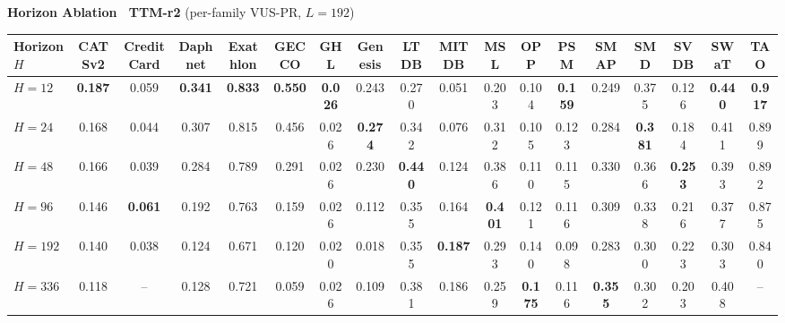 \documentclass[border=2pt,varwidth=\maxdimen]{standalone}
\begin{document}
\begin{center}
\textbf{\large Horizon Ablation \textemdash\ TTM-r2} \quad (per-family VUS-PR, $L=192$)\par\vspace{6pt}
\renewcommand{\arraystretch}{1.1}
\setlength{\tabcolsep}{3pt}
\footnotesize

\begin{tabular}{l|ccccccccccccccccc}
\toprule
\textbf{Horizon $H$} & \textbf{CATSv2} & \textbf{CreditCard} & \textbf{Daphnet} & \textbf{Exathlon} & \textbf{GECCO} & \textbf{GHL} & \textbf{Genesis} & \textbf{LTDB} & \textbf{MITDB} & \textbf{MSL} & \textbf{OPP} & \textbf{PSM} & \textbf{SMAP} & \textbf{SMD} & \textbf{SVDB} & \textbf{SWaT} & \textbf{TAO} \\
\midrule
\textbf{$H=12$} & \textbf{0.187} & 0.059 & \textbf{0.341} & \textbf{0.833} & \textbf{0.550} & \textbf{0.026} & 0.243 & 0.270 & 0.051 & 0.203 & 0.104 & \textbf{0.159} & 0.249 & 0.375 & 0.126 & \textbf{0.440} & \textbf{0.917} \\
\textbf{$H=24$} & 0.168 & 0.044 & 0.307 & 0.815 & 0.456 & 0.026 & \textbf{0.274} & 0.342 & 0.076 & 0.312 & 0.105 & 0.123 & 0.284 & \textbf{0.381} & 0.184 & 0.411 & 0.899 \\
\textbf{$H=48$} & 0.166 & 0.039 & 0.284 & 0.789 & 0.291 & 0.026 & 0.230 & \textbf{0.440} & 0.124 & 0.386 & 0.110 & 0.115 & 0.330 & 0.366 & \textbf{0.253} & 0.393 & 0.892 \\
\textbf{$H=96$} & 0.146 & \textbf{0.061} & 0.192 & 0.763 & 0.159 & 0.026 & 0.112 & 0.355 & 0.164 & \textbf{0.401} & 0.121 & 0.116 & 0.309 & 0.338 & 0.216 & 0.377 & 0.875 \\
\textbf{$H=192$} & 0.140 & 0.038 & 0.124 & 0.671 & 0.120 & 0.020 & 0.018 & 0.355 & \textbf{0.187} & 0.293 & 0.140 & 0.098 & 0.283 & 0.300 & 0.223 & 0.303 & 0.840 \\
\textbf{$H=336$} & 0.118 & -- & 0.128 & 0.721 & 0.059 & 0.026 & 0.109 & 0.381 & 0.186 & 0.259 & \textbf{0.175} & 0.116 & \textbf{0.355} & 0.302 & 0.203 & 0.408 & -- \\
\bottomrule
\end{tabular}
\end{center}
\end{document}

